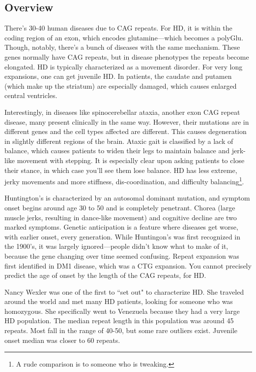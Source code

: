 \documentclass[12pt]{report}
\begin{document}
\subsection{Overview}
There's 30-40 human diseases due to CAG repeats. For HD, it is within the coding region of an exon, which encodes glutamine---which becomes a polyGlu. Though, notably, there's a bunch of diseases with the same mechanism. These genes normally have CAG repeats, but in disease phenotypes the repeats become elongated. HD is typically characterized as a movement disorder. For very long expansions, one can get juvenile HD. In patients, the caudate and putamen (which make up the striatum) are especially damaged, which causes enlarged central ventricles. \newline

Interestingly, in diseases like spinocerebellar ataxia, another exon CAG repeat disease, many present clinically in the same way. However, their mutations are in different genes and the cell types affected are different. This causes degeneration in slightly different regions of the brain. Ataxic gait is classified by a lack of balance, which causes patients to widen their legs to maintain balance and jerk-like movement with stepping. It is especially clear upon asking patients to close their stance, in which case you'll see them lose balance. HD has less extreme, jerky movements and more stiffness, dis-coordination, and difficulty balancing\footnote{A rude comparison is to someone who is tweaking.}. \newline

Huntington's is characterized by an autosomal dominant mutation, and symptom onset begins around age 30 to 50 and is completely penetrant. Chorea (large muscle jerks, resulting in dance-like movement) and cognitive decline are two marked symptoms. Genetic anticipation is a feature where diseases get worse, with earlier onset, every generation. While Huntingon's was first recognized in the 1900's, it was largely ignored---people didn't know what to make of it, because the gene changing over time seemed confusing. Repeat expansion was first identified in DM1 disease, which was a CTG expansion. You cannot precisely predict the age of onset by the length of the CAG repeats, for HD. \newline

Nancy Wexler was one of the first to ``set out" to characterize HD. She traveled around the world and met many HD patients, looking for someone who was homozygous. She specifically went to Venezuela because they had a very large HD population. The median repeat length in this population was around 45 repeats. Most fall in the range of 40-50, but some rare outliers exist. Juvenile onset median was closer to 60 repeats.\newline
\end{document}
